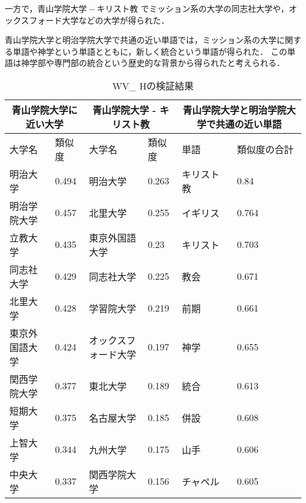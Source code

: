 一方で，$ 青山学院大学 - キリスト教 $ でミッション系の大学の同志社大学や，オックスフォード大学などの大学が得られた．

青山学院大学と明治学院大学で共通の近い単語では，ミッション系の大学に関する単語や神学という単語とともに，新しく統合という単語が得られた．
この単語は神学部や専門部の統合という歴史的な背景から得られたと考えられる．

\begin{table}[H]
\caption{WV\_ Hの検証結果}
\centering
\footnotesize
\begin{tabular}{ll|ll|ll}
\hline
\multicolumn{2}{c}{青山学院大学に近い大学} & \multicolumn{2}{c}{青山学院大学 - キリスト教} & \multicolumn{2}{c}{青山学院大学と明治学院大学で共通の近い単語}
\\ \hline
大学名 & 類似度 & 大学名 & 類似度 & 単語 & 類似度の合計
\\ \hline \hline
明治大学 & 0.494 & 明治大学 & 0.263 & キリスト教 & 0.84\\
明治学院大学 & 0.457 & 北里大学 & 0.255 & イギリス & 0.764\\
立教大学 & 0.435 & 東京外国語大学 & 0.23 & キリスト & 0.703\\
同志社大学 & 0.429 & 同志社大学 & 0.225 & 教会 & 0.671\\
北里大学 & 0.428 & 学習院大学 & 0.219 & 前期 & 0.661\\
東京外国語大学 & 0.424 & オックスフォード大学 & 0.197 & 神学 & 0.655\\
関西学院大学 & 0.377 & 東北大学 & 0.189 & 統合 & 0.613\\
短期大学 & 0.375 & 名古屋大学 & 0.185 & 併設 & 0.608\\
上智大学 & 0.344 & 九州大学 & 0.175 & 山手 & 0.606\\
中央大学 & 0.337 & 関西学院大学 & 0.156 & チャペル & 0.605\\ \hline
\end{tabular}
\label{table:wvh}
\end{table}